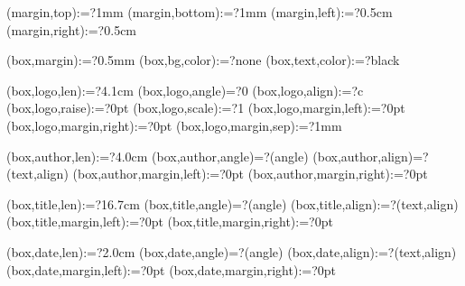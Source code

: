 \spine(margin,top):=?{1mm}
\spine(margin,bottom):=?{1mm}
\spine(margin,left):=?{0.5cm}
\spine(margin,right):=?{0.5cm}

\spine(box,margin):=?{0.5mm}
\spine(box,bg,color):=?{none}
\spine(box,text,color):=?{black}

\spine(box,logo,len):=?{4.1cm}
\spine(box,logo,angle)=?{0}
\spine(box,logo,align):=?{c}
\spine(box,logo,raise):=?{0pt}
\spine(box,logo,scale):=?{1}
\spine(box,logo,margin,left):=?{0pt}
\spine(box,logo,margin,right):=?{0pt}
\spine(box,logo,margin,sep):=?{1mm}

\spine(box,author,len):=?{4.0cm}
\spine(box,author,angle)=?{\thespine(angle)}
\spine(box,author,align)=?{\thespine(text,align)}
\spine(box,author,margin,left):=?{0pt}
\spine(box,author,margin,right):=?{0pt}

\spine(box,title,len):=?{16.7cm}
\spine(box,title,angle)=?{\thespine(angle)}
\spine(box,title,align):=?{\thespine(text,align)}
\spine(box,title,margin,left):=?{0pt}
\spine(box,title,margin,right):=?{0pt}

\spine(box,date,len):=?{2.0cm}
\spine(box,date,angle)=?{\thespine(angle)}
\spine(box,date,align):=?{\thespine(text,align)}
\spine(box,date,margin,left):=?{0pt}
\spine(box,date,margin,right):=?{0pt}



\newif\ifisdim
\newcommand{\@setifisdim}[1]{%
  \StrLeft{#1}{1}[\@dimleft]%
  \StrRight{#1}{1}[\@dimright]%
  \IfInteger{\@dimleft}{%
    \IfInteger{\@dimright}{%
      \isdimfalse%
    }{%
      \isdimtrue%
    }%
  }{%
    \isdimfalse%
  }%
}
\newcommand{\IfIsDim}[3]{%
  \@setifisdim{#1}%
  \ifisdim#2\else#3\fi%
}

%

\newdimen\@spinelen  %
\newcommand{\@checkspinelen}[1][\paperheight]{%
  \@tempdima=\thespine(margin,left)\relax%
  \@tempdimb=\thespine(margin,right)\relax%
  \DEBUG{SPINELEN MARGIN [left] = \the\@tempdima}%
  \DEBUG{SPINELEN MARGIN [right] = \the\@tempdimb}%
  \@tempdima=\dimexpr\@tempdima+\@tempdimb\relax%
  \DEBUG{SPINELEN ACCUMULATED = \the\@tempdima}%
  \StrCount{\thespine(order)}{,}[\@nBoxSep]%
  \@for\myi:=\expanded{\thespine(order)}\do{%
    \DEBUG{SPINELEN BOXLEN [\myi]}%
    \@tempdimb=\thespine(box,\myi,len)\relax%
    \DEBUG{SPINELEN BOXLEN [\myi] = \the\@tempdimb}%
    \@tempdima=\dimexpr\@tempdima+\@tempdimb\relax%
    \DEBUG{SPINELEN ACCUMULATED = \the\@tempdima}%
  }
  \DEBUG{SPINELEN MAX = \the#1}%
  \@spinelen=\@tempdima%
}


